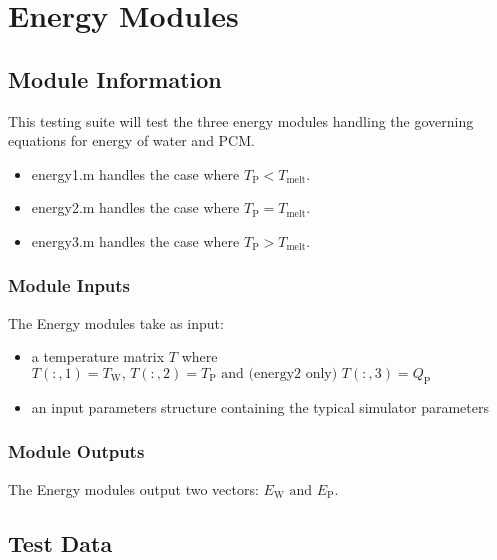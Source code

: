 \documentclass[12pt]{article}
\begin{document}
\section{Energy Modules}

\subsection{Module Information}
This testing suite will test the three energy modules handling the governing 
equations for energy of water and PCM.
\begin{itemize}
\item energy1.m handles the case where $T_{\text{P}} < T_{\text{melt}}$.
\item energy2.m handles the case where $T_{\text{P}} = T_{\text{melt}}$.
\item energy3.m handles the case where $T_{\text{P}} > T_{\text{melt}}$.
\end{itemize}

\subsubsection{Module Inputs}
The Energy modules take as input:
\begin{itemize}
\item a temperature matrix $T$ where $T(:,1) = T_{\text{W}} \text{, }
T(:,2) = T_{\text{P}} \text{ and (energy2 only) } T(:,3) = Q_{\text{P}}$
\item an input parameters structure containing the typical simulator parameters
\end{itemize}

\subsubsection{Module Outputs}
The Energy modules output two vectors: $E_{\text{W}} \text{ and } E_{\text{P}}$.

\subsection{Test Data}
\end{document}

